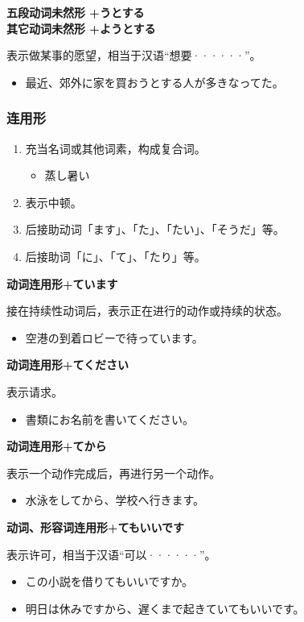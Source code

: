 {\bf
\noindent 五段动词未然形 \cn[2] +うとする\\
\noindent 其它动词未然形 \cn[2] +ようとする
}

表示做某事的愿望，相当于汉语``想要······''。
\begin{itemize}
  \item 最近、郊外に家を買おうとする人が多きなってた。
\end{itemize}


\subsubsection{连用形}%

\begin{enumerate}
  \item 充当名词或其他词素，构成复合词。
    \begin{itemize}
      \item 蒸し暑い
    \end{itemize}
  \item 表示中顿。
  \item 后接助动词「ます」、「た」、「たい」、「そうだ」等。
  \item 后接助词「に」、「て」、「たり」等。
\end{enumerate}

{\bf
\noindent 动词连用形+ています
}

接在持续性动词后，表示正在进行的动作或持续的状态。
\begin{itemize}
  \item 空港の到着ロビーで待っています。
\end{itemize}

{\bf
\noindent 动词连用形+てください
}

表示请求。
\begin{itemize}
  \item 書類にお名前を書いてください。
\end{itemize}

{\bf
\noindent 动词连用形+てから
}

表示一个动作完成后，再进行另一个动作。
\begin{itemize}
  \item 水泳をしてから、学校へ行きます。
\end{itemize}

{\bf
\noindent 动词、形容词连用形+てもいいです
}

表示许可，相当于汉语``可以······''。
\begin{itemize}
  \item この小説を借りてもいいですか。
  \item 明日は休みですから、遅くまで起きていてもいいです。
\end{itemize}

